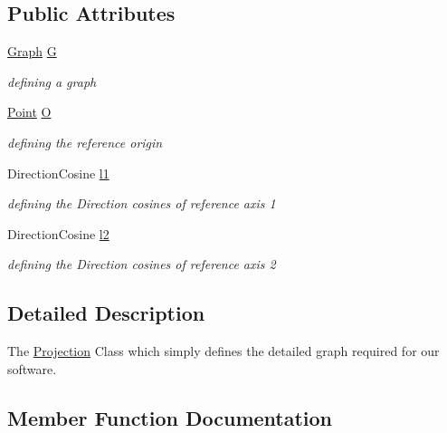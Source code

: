 \subsection*{Public Attributes}
\begin{DoxyCompactItemize}
\item 
\mbox{\hyperlink{class_graph}{Graph}} \mbox{\hyperlink{class_projection_a60e6ed7cb3fbdf833d22bbfaa044be42}{G}}
\begin{DoxyCompactList}\small\item\em defining a graph \end{DoxyCompactList}\item 
\mbox{\hyperlink{class_point}{Point}} \mbox{\hyperlink{class_projection_a9400a70d8820176f4731eae11fce8ca2}{O}}
\begin{DoxyCompactList}\small\item\em defining the reference origin \end{DoxyCompactList}\item 
Direction\+Cosine \mbox{\hyperlink{class_projection_a2fdb6f244ddff5e2201c62df694aaae4}{l1}}
\begin{DoxyCompactList}\small\item\em defining the Direction cosines of reference axis 1 \end{DoxyCompactList}\item 
Direction\+Cosine \mbox{\hyperlink{class_projection_a70ac3592a798a01019ec35ba2c3247ea}{l2}}
\begin{DoxyCompactList}\small\item\em defining the Direction cosines of reference axis 2 \end{DoxyCompactList}\end{DoxyCompactItemize}


\subsection{Detailed Description}
The \mbox{\hyperlink{class_projection}{Projection}} Class which simply defines the detailed graph required for our software. 

\subsection{Member Function Documentation}
\mbox{\label{class_projection_ae99d107febc961e7ae8232623d930b82}} 
